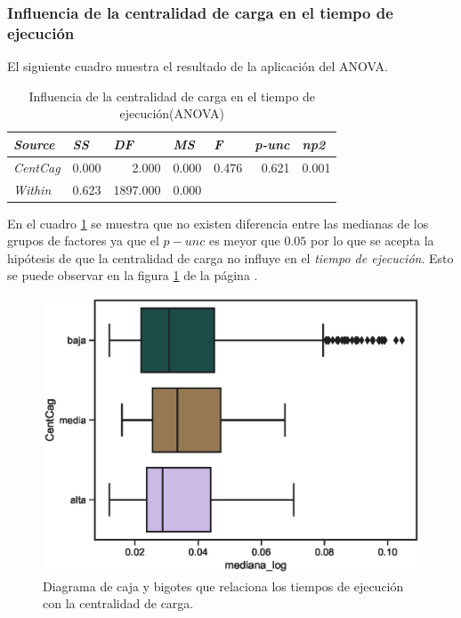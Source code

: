 \documentclass{article}
\begin{document}
\subsubsection{Influencia de la centralidad de carga en el tiempo de ejecución}

El siguiente cuadro muestra el resultado de la aplicación del ANOVA.

\begin{table}[htbp]
  \centering
  \caption{Influencia de la centralidad de carga en el tiempo de ejecución(ANOVA)}
    \begin{tabular}{lrrrrrr}
    \toprule
    \textit{\textbf{Source}} & \multicolumn{1}{l}{\textit{\textbf{SS}}} & \multicolumn{1}{l}{\textit{\textbf{DF}}} & \multicolumn{1}{l}{\textit{\textbf{MS}}} & \multicolumn{1}{l}{\textit{\textbf{F}}} & \multicolumn{1}{l}{\textit{\textbf{p-unc}}} & \multicolumn{1}{l}{\textit{\textbf{np2}}} \\
    \midrule
    \textit{CentCag} & 0.000 & 2.000 & 0.000 & 0.476 & 0.621 & 0.001 \\
    \textit{Within} & 0.623 & 1897.000 & 0.000 &       &       &  \\
    \bottomrule
    \end{tabular}%
  \label{tab:t9}%
\end{table}%

En el cuadro \ref{tab:t9} se muestra que no existen diferencia entre las medianas de los grupos de factores ya que el \emph{$p-unc$} es meyor que $0.05$ por lo que se acepta la hipótesis de que la centralidad de carga no influye en el \textit{tiempo de ejecución}. Esto se puede observar en la figura \ref{fig16} de la página \pageref{fig16}.

\begin{center}
\begin{figure}[htbp]
\includegraphics[scale=0.6]{boxplot_CentCag.eps}
\caption{Diagrama de caja y bigotes que relaciona los tiempos de ejecución con la centralidad de carga.}
\label{fig16}
\end{figure}
\end{center}
\end{document}
